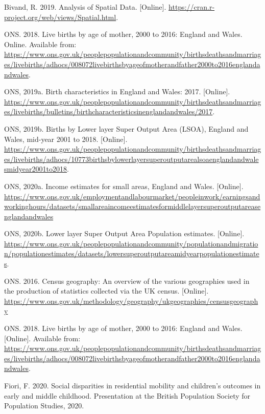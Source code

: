 \documentclass[12pt,twoside]{reedthesis}
\begin{document}

\noindent

\setlength{\parindent}{-0.20in}
\setlength{\leftskip}{0.20in}
\setlength{\parskip}{8pt}

Bivand, R. 2019. Analysis of Spatial Data. {[}Online{]}. \url{https://cran.r-project.org/web/views/Spatial.html}.

ONS. 2018. Live births by age of mother, 2000 to 2016: England and Wales. Online. Available from: \url{https://www.ons.gov.uk/peoplepopulationandcommunity/birthsdeathsandmarriages/livebirths/adhocs/008072livebirthsbyageofmotherandfather2000to2016englandandwales}.

ONS, 2019a. Birth characteristics in England and Wales: 2017. {[}Online{]}. \url{https://www.ons.gov.uk/peoplepopulationandcommunity/birthsdeathsandmarriages/livebirths/bulletins/birthcharacteristicsinenglandandwales/2017}.

ONS, 2019b. Births by Lower layer Super Output Area (LSOA), England and Wales, mid-year 2001 to 2018. {[}Online{]}. \url{https://www.ons.gov.uk/peoplepopulationandcommunity/birthsdeathsandmarriages/livebirths/adhocs/10773birthsbylowerlayersuperoutputarealsoaenglandandwalesmidyear2001to2018}.

ONS, 2020a. Income estimates for small areas, England and Wales. {[}Online{]}. \url{https://www.ons.gov.uk/employmentandlabourmarket/peopleinwork/earningsandworkinghours/datasets/smallareaincomeestimatesformiddlelayersuperoutputareasenglandandwales}

ONS, 2020b. Lower layer Super Output Area Population estimates. {[}Online{]}. \url{https://www.ons.gov.uk/peoplepopulationandcommunity/populationandmigration/populationestimates/datasets/lowersuperoutputareamidyearpopulationestimates}.

ONS. 2016. Census geography: An overview of the various geographies used in the production of statistics collected via the UK census. {[}Online{]}. \url{https://www.ons.gov.uk/methodology/geography/ukgeographies/censusgeography}

ONS. 2018. Live births by age of mother, 2000 to 2016: England and Wales. {[}Online{]}. Available from: \url{https://www.ons.gov.uk/peoplepopulationandcommunity/birthsdeathsandmarriages/livebirths/adhocs/008072livebirthsbyageofmotherandfather2000to2016englandandwales}.

Fiori, F. 2020. Social disparities in residential mobility and children's outcomes in early and middle childhood. Presentation at the British Population Society for Population Studies, 2020.
\end{document}
